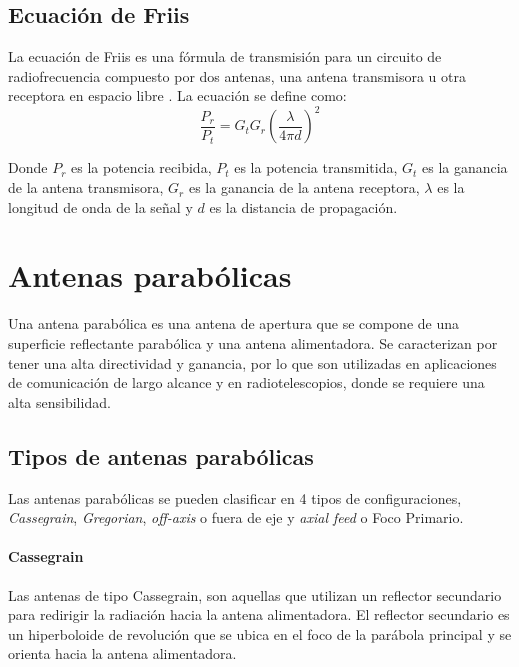 \subsection{Ecuación de Friis}

La ecuación de Friis es una fórmula de transmisión para un circuito de radiofrecuencia compuesto por dos antenas, una antena transmisora u otra receptora en espacio libre \cite{Friis1946}. La ecuación se define como:\\

\begin{equation}
    \frac{P_{r}}{P_{t}} = G_{t}G_{r}\left(\frac{\lambda}{4\pi d}\right)^{2}
\end{equation}

Donde $P_{r}$ es la potencia recibida, $P_{t}$ es la potencia transmitida, $G_{t}$ es la ganancia de la antena transmisora, $G_{r}$ es la ganancia de la antena receptora, $\lambda$ es la longitud de onda de la señal y $d$ es la distancia de propagación.\\

\section{Antenas parabólicas}

Una antena parabólica es una antena de apertura que se compone de una superficie reflectante parabólica y una antena alimentadora. Se caracterizan por tener una alta directividad y ganancia, por lo que son utilizadas en aplicaciones de comunicación de largo alcance y en radiotelescopios, donde se requiere una alta sensibilidad.\\


\subsection{Tipos de antenas parabólicas}

Las antenas parabólicas se pueden clasificar en 4 tipos de configuraciones, \textit{Cassegrain}, \textit{Gregorian}, \textit{off-axis} o fuera de eje y \textit{axial feed} o Foco Primario.\\

\paragraph{Cassegrain}

Las antenas de tipo Cassegrain, son aquellas que utilizan un reflector secundario para redirigir la radiación hacia la antena alimentadora. El reflector secundario es un hiperboloide de revolución que se ubica en el foco de la parábola principal y se orienta hacia la antena alimentadora.

